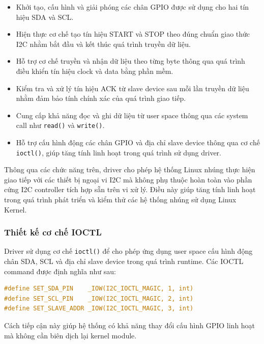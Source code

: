 \begin{itemize}
    \item Khởi tạo, cấu hình và giải phóng các chân GPIO được sử dụng cho hai tín hiệu SDA và SCL.
    
    \item Hiện thực cơ chế tạo tín hiệu START và STOP theo đúng chuẩn giao thức I2C nhằm bắt đầu và kết thúc quá trình truyền dữ liệu.
    
    \item Hỗ trợ cơ chế truyền và nhận dữ liệu theo từng byte thông qua quá trình điều khiển tín hiệu clock và data bằng phần mềm.
    
    \item Kiểm tra và xử lý tín hiệu ACK từ slave device sau mỗi lần truyền dữ liệu nhằm đảm bảo tính chính xác của quá trình giao tiếp.
    
    \item Cung cấp khả năng đọc và ghi dữ liệu từ user space thông qua các system call như \texttt{read()} và \texttt{write()}.
    
    \item Hỗ trợ cấu hình động các chân GPIO và địa chỉ slave device thông qua cơ chế \texttt{ioctl()}, giúp tăng tính linh hoạt trong quá trình sử dụng driver.
\end{itemize}

Thông qua các chức năng trên, driver cho phép hệ thống Linux nhúng thực hiện giao tiếp với các thiết bị ngoại vi I2C mà không phụ thuộc hoàn toàn vào phần cứng I2C controller tích hợp sẵn trên vi xử lý. Điều này giúp tăng tính linh hoạt trong quá trình phát triển và kiểm thử các hệ thống nhúng sử dụng Linux Kernel.

\subsubsection{Thiết kế cơ chế IOCTL}

Driver sử dụng cơ chế \texttt{ioctl()} để cho phép ứng dụng user space cấu hình động chân SDA, SCL và địa chỉ slave device trong quá trình runtime.
Các IOCTL command được định nghĩa như sau:

\begin{lstlisting}[style=thesisstyle, language=C]
#define SET_SDA_PIN    _IOW(I2C_IOCTL_MAGIC, 1, int)
#define SET_SCL_PIN    _IOW(I2C_IOCTL_MAGIC, 2, int)
#define SET_SLAVE_ADDR _IOW(I2C_IOCTL_MAGIC, 3, int)
\end{lstlisting}

Cách tiếp cận này giúp hệ thống có khả năng thay đổi cấu hình GPIO linh hoạt mà không cần biên dịch lại kernel module.

